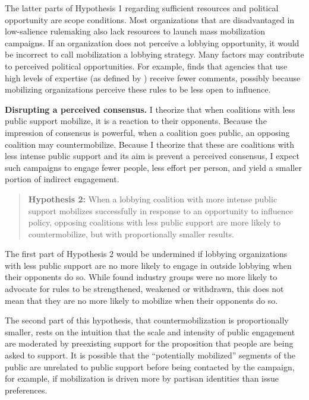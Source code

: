 \documentclass[
      12pt,
        ]{article}
\begin{document}
The latter parts of Hypothesis 1 regarding sufficient resources and political
opportunity are scope conditions. Most organizations that are
disadvantaged in low-salience rulemaking also lack resources to launch
mass mobilization campaigns. If an organization does not perceive a
lobbying opportunity, it would be incorrect to call mobilization a
lobbying strategy. Many factors may contribute to perceived political
opportunities. For example, \citet{Moore2017} finds that agencies that use high
levels of expertise (as defined by \citet{Selin2015}) receive fewer comments,
possibly because mobilizing organizations perceive these rules to be
less open to influence.

\textbf{Disrupting a perceived consensus.} I theorize that when coalitions
with less public support mobilize, it is a reaction to their opponents.
Because the impression of consensus is powerful, when a coalition goes
public, an opposing coalition may countermobilize. Because I theorize
that these are coalitions with less intense public support and its aim
is prevent a perceived consensus, I expect such campaigns to engage
fewer people, less effort per person, and yield a smaller portion of
indirect engagement.



\begin{quote}
\textbf{Hypothesis 2:} When a lobbying
coalition with more intense public support mobilizes successfully in
response to an opportunity to influence policy, opposing coalitions with
less public support are more likely to countermobilize, but with
proportionally smaller results.
\end{quote}

The first part of Hypothesis 2 would be undermined if lobbying organizations
with less public support are no more likely to engage in outside
lobbying when their opponents do so. While \citet{Potter2017} found industry
groups were no more likely to advocate for rules to be strengthened,
weakened or withdrawn, this does not mean that they are no more likely
to mobilize when their opponents do so.

The second part of this hypothesis, that countermobilization is
proportionally smaller, rests on the intuition that the scale and
intensity of public engagement are moderated by preexisting support for
the proposition that people are being asked to support. It is possible
that the ``potentially mobilized'' segments of the public are unrelated to
public support before being contacted by the campaign, for example, if
mobilization is driven more by partisan identities than issue
preferences.
\end{document}
